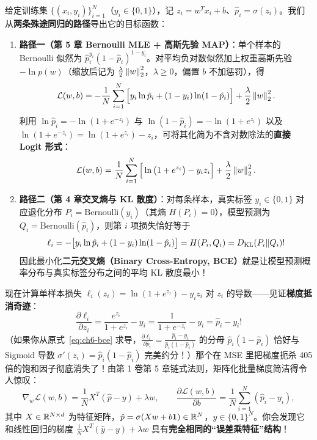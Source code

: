 给定训练集 $\{(x_i, y_i)\}_{i=1}^N$（$y_i \in \{0, 1\}$），记 $z_i = w^T x_i + b$、$\hat{p}_i = \sigma(z_i)$。我们从\textbf{两条殊途同归的路径}导出它的目标函数：
\begin{enumerate}
  \item \textbf{路径一（第 5 章 Bernoulli MLE + 高斯先验 MAP）}：单个样本的 Bernoulli 似然为 $\hat{p}_i^{y_i}(1 - \hat{p}_i)^{1 - y_i}$。对平均负对数似然加上权重高斯先验 $-\ln p(w)$（缩放后记为 $\frac{\lambda}{2}\left\|w\right\|_2^2$，$\lambda \ge 0$，偏置 $b$ 不加惩罚），得
  \begin{equation}
    \mathcal{L}(w, b)
    = -\frac{1}{N}\sum_{i=1}^N \Big[y_i\ln \hat{p}_i + (1 - y_i)\ln(1 - \hat{p}_i)\Big] + \frac{\lambda}{2}\left\|w\right\|_2^2.
    \label{eq:ch6-bce}
  \end{equation}
  利用 $\ln \hat{p}_i = -\ln(1+e^{-z_i})$ 与 $\ln(1-\hat{p}_i) = -\ln(1+e^{z_i})$ 以及 $\ln(1+e^{-z_i}) = \ln(1+e^{z_i}) - z_i$，可将其化简为不含对数除法的\textbf{直接 Logit 形式}：
  \begin{equation}
    \mathcal{L}(w, b)
    = \frac{1}{N}\sum_{i=1}^N \Big[\ln\big(1 + e^{z_i}\big) - y_i z_i\Big] + \frac{\lambda}{2}\left\|w\right\|_2^2.
    \label{eq:ch6-bce-logit}
  \end{equation}
  \item \textbf{路径二（第 4 章交叉熵与 KL 散度）}：对每条样本，真实标签 $y_i \in \{0,1\}$ 对应退化分布 $P_i = \mathrm{Bernoulli}(y_i)$（其熵 $H(P_i) = 0$），模型预测为 $Q_i = \mathrm{Bernoulli}(\hat{p}_i)$，则第 $i$ 项损失恰好等于
  \[
    \ell_i = -\big[y_i\ln\hat{p}_i + (1 - y_i)\ln(1 - \hat{p}_i)\big] = H(P_i, Q_i) = D_{\mathrm{KL}}(P_i \| Q_i)!
  \]
  因此最小化\textbf{二元交叉熵（Binary Cross-Entropy, BCE）}就是让模型预测概率分布与真实标签分布之间的平均 KL 散度最小！
\end{enumerate}

现在计算单样本损失 $\ell_i(z_i) = \ln(1 + e^{z_i}) - y_i z_i$ 对 $z_i$ 的导数——见证\textbf{梯度抵消奇迹}：
\[
  \frac{\partial \ell_i}{\partial z_i}
  = \frac{e^{z_i}}{1 + e^{z_i}} - y_i
  = \frac{1}{1 + e^{-z_i}} - y_i
  = \hat{p}_i - y_i!
\]
（如果你从原式~\eqref{eq:ch6-bce} 求导，$\frac{\partial\ell_i}{\partial \hat{p}_i} = \frac{\hat{p}_i - y_i}{\hat{p}_i(1-\hat{p}_i)}$ 的分母 $\hat{p}_i(1-\hat{p}_i)$ 恰好与 Sigmoid 导数 $\sigma'(z_i) = \hat{p}_i(1-\hat{p}_i)$ 完美约分！）那个在 MSE 里把梯度扼杀 405 倍的饱和因子彻底消失了！由第 1 卷第 5 章链式法则，矩阵化批量梯度简洁得令人惊叹：
\begin{equation}
  \nabla_w \mathcal{L}(w, b) = \frac{1}{N} X^T (\hat{p} - y) + \lambda w,
  \qquad
  \frac{\partial \mathcal{L}(w, b)}{\partial b} = \frac{1}{N}\sum_{i=1}^N (\hat{p}_i - y_i),
  \label{eq:ch6-bce-grad}
\end{equation}
其中 $X \in \mathbb{R}^{N\times d}$ 为特征矩阵，$\hat{p} = \sigma(Xw + b\mathbf{1}) \in \mathbb{R}^N$，$y \in \{0,1\}^N$。你会发现它和线性回归的梯度 $\frac{1}{N}X^T(\hat{y} - y) + \lambda w$ 具有\textbf{完全相同的“误差乘特征”结构}！

